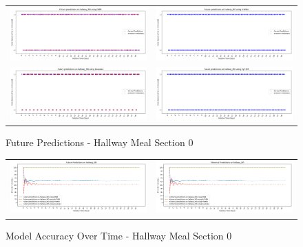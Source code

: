 \begin{figure}
  \begin{tabular}{cc}
    {\includegraphics[width = 3in]{images/results/Future_hallway_M0_DMM.png}} &
    {\includegraphics[width = 3in]{images/results/Future_hallway_M0_FreMEn.png}} \\
    {\includegraphics[width = 3in]{images/results/Future_hallway_M0_Gaussian.png}} &
    {\includegraphics[width = 3in]{images/results/Future_hallway_M0_HyT-EM.png}} \\
  \end{tabular}
  \caption{Future Predictions - Hallway Meal Section 0}
\end{figure}

\begin{figure}
  \begin{tabular}{cc}
    {\includegraphics[width = 3in]{images/results/Future_Predictions_on_hallway_M0.png}} &
    {\includegraphics[width = 3in]{images/results/Historical_Predictions_on_hallway_M0.png}} \\
  \end{tabular}
  \caption{Model Accuracy Over Time - Hallway Meal Section 0}
\end{figure}



